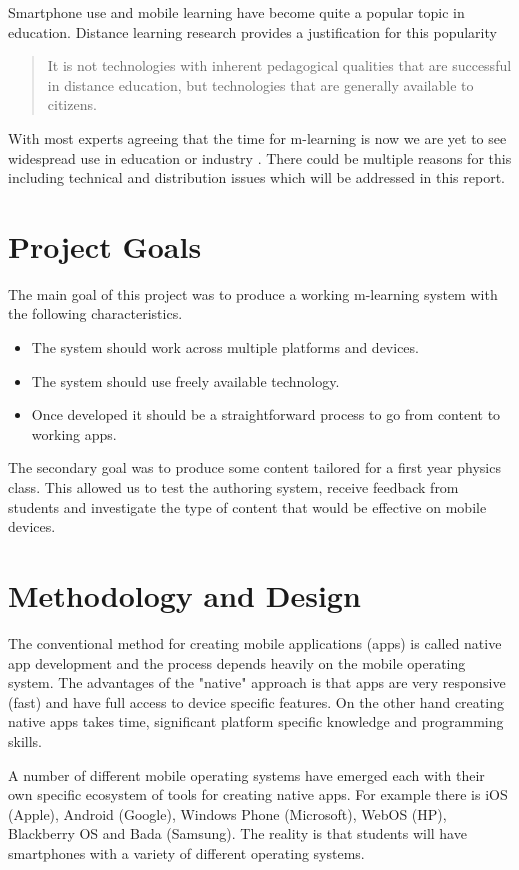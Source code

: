 \documentclass[12pt,a4paper]{article}  %
\begin{document}
Smartphone use and mobile learning have become quite a popular topic in education. Distance learning research provides a justification for this popularity \cite{keegan}
\begin{quote}It is not technologies with inherent pedagogical qualities that are successful in distance education, but technologies that are generally available to citizens.\end{quote}

With most experts agreeing that the time for m-learning is now we are yet to see widespread use in education or industry \cite{pie}. There could be multiple reasons for this including technical and distribution issues which will be addressed in this report.

\section{Project Goals}

The main goal of this project was to produce a working m-learning system with the following characteristics.
\begin{itemize}
\item The system should work across multiple platforms and devices.
\item The system should use freely available technology.
\item Once developed it should be a straightforward process to go from content to working apps.
\end{itemize}

The secondary goal was to produce some content tailored for a first year physics class. This allowed us to test the authoring system, receive feedback from students and investigate the type of content that would be effective on mobile devices.

\section{Methodology and Design}

The conventional method for creating mobile applications (apps) is called native app development and the process depends heavily on the mobile operating system. The advantages of the "native" approach is that apps are very responsive (fast) and have full access to device specific features. On the other hand creating native apps takes time, significant platform specific knowledge and programming skills.

A number of different mobile operating systems have emerged each with their own specific ecosystem of tools for creating native apps. For example there is iOS (Apple), Android (Google), Windows Phone (Microsoft), WebOS (HP), Blackberry OS and Bada (Samsung). The reality is that students will have smartphones with a variety of different operating systems.
\end{document}
